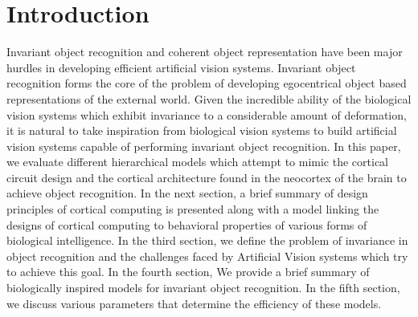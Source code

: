 \documentclass[12pt,twoside]{article}
\theoremstyle{plain}
\theoremstyle{definition}
\theoremstyle{remark}
\begin{document}


\section{Introduction}
\label{sec:introduction}
Invariant object recognition and coherent object representation have been major hurdles in developing efficient artificial vision systems. Invariant object recognition forms the core of the problem of developing egocentrical object based representations of the external world. Given the incredible ability of the biological vision systems which exhibit invariance to a considerable amount of deformation, it is natural to take inspiration from biological vision systems to build artificial vision systems capable of performing invariant object recognition. In this paper, we evaluate different hierarchical models which attempt to mimic the cortical circuit design and the cortical architecture found in the neocortex of the brain to achieve object recognition. In the next section, a brief summary of design principles of cortical computing is presented along with a model \cite{Grossberg2007} linking the designs of cortical computing to behavioral properties of various forms of biological intelligence. In the third section, we define the problem of invariance in object recognition\cite{rohtua} and the challenges faced by Artificial Vision systems which try to achieve this goal. In the fourth section, We provide a brief summary of biologically inspired models for invariant object recognition\cite{Fukushim1980}\cite{JimMutch2008}\cite{NicolasPinto2009}\cite{MarkusLessmann2014}\cite{ThomasSerre2007}\cite{XiaolinHu2014}. In the fifth section, we discuss various parameters that determine the efficiency of these models.
\end{document}
